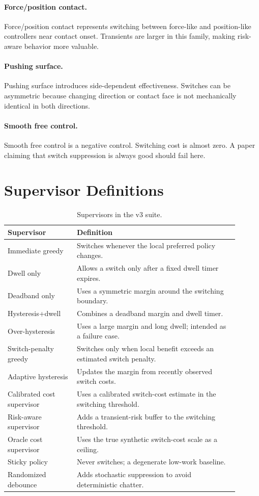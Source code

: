 \documentclass{article}
\begin{document}
\paragraph{Force/position contact.}
Force/position contact represents switching between force-like and position-like controllers near contact onset.
Transients are larger in this family, making risk-aware behavior more valuable.

\paragraph{Pushing surface.}
Pushing surface introduces side-dependent effectiveness.
Switches can be asymmetric because changing direction or contact face is not mechanically identical in both directions.

\paragraph{Smooth free control.}
Smooth free control is a negative control.
Switching cost is almost zero.
A paper claiming that switch suppression is always good should fail here.

\section{Supervisor Definitions}

\begin{table}[h]
\centering
\caption{Supervisors in the v3 suite.}
\small
\begin{tabular}{p{0.27\linewidth}p{0.63\linewidth}}
\toprule
Supervisor & Definition \\
\midrule
Immediate greedy & Switches whenever the local preferred policy changes. \\
Dwell only & Allows a switch only after a fixed dwell timer expires. \\
Deadband only & Uses a symmetric margin around the switching boundary. \\
Hysteresis+dwell & Combines a deadband margin and dwell timer. \\
Over-hysteresis & Uses a large margin and long dwell; intended as a failure case. \\
Switch-penalty greedy & Switches only when local benefit exceeds an estimated switch penalty. \\
Adaptive hysteresis & Updates the margin from recently observed switch costs. \\
Calibrated cost supervisor & Uses a calibrated switch-cost estimate in the switching threshold. \\
Risk-aware supervisor & Adds a transient-risk buffer to the switching threshold. \\
Oracle cost supervisor & Uses the true synthetic switch-cost scale as a ceiling. \\
Sticky policy & Never switches; a degenerate low-work baseline. \\
Randomized debounce & Adds stochastic suppression to avoid deterministic chatter. \\
\bottomrule
\end{tabular}
\end{table}
\end{document}
